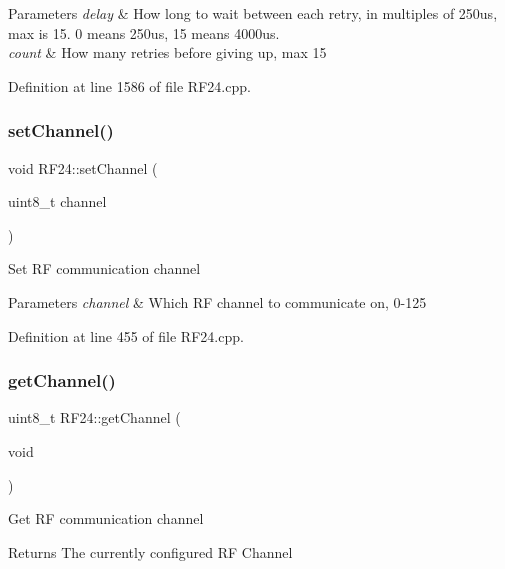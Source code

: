 \begin{DoxyParams}{Parameters}
{\em delay} & How long to wait between each retry, in multiples of 250us, max is 15. 0 means 250us, 15 means 4000us. \\
\hline
{\em count} & How many retries before giving up, max 15 \\
\hline
\end{DoxyParams}


Definition at line 1586 of file R\+F24.\+cpp.

\mbox{\label{classRF24_a5e6e5a5f6c85d2638381cab2c0f3702e}} 
\subsubsection{\texorpdfstring{set\+Channel()}{setChannel()}}
{\footnotesize\ttfamily void R\+F24\+::set\+Channel (\begin{DoxyParamCaption}\item[{uint8\+\_\+t}]{channel }\end{DoxyParamCaption})}

Set RF communication channel


\begin{DoxyParams}{Parameters}
{\em channel} & Which RF channel to communicate on, 0-\/125 \\
\hline
\end{DoxyParams}


Definition at line 455 of file R\+F24.\+cpp.

\mbox{\label{classRF24_a6a66a94609309e17edaa1919e66cea0a}} 
\subsubsection{\texorpdfstring{get\+Channel()}{getChannel()}}
{\footnotesize\ttfamily uint8\+\_\+t R\+F24\+::get\+Channel (\begin{DoxyParamCaption}\item[{void}]{ }\end{DoxyParamCaption})}

Get RF communication channel

\begin{DoxyReturn}{Returns}
The currently configured RF Channel 
\end{DoxyReturn}


